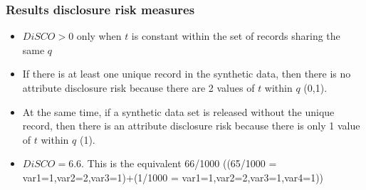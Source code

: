 \documentclass[t,8pt,utfx8]{beamer}
\begin{document}
\begin{spacing}{1.25}
\begin{frame}[t]\frametitle{Results disclosure risk measures}
\begin{minipage}[t]{0.48\textwidth}
    \begin{table}[]
        \centering
        \caption{x 1 synthetic data set (seed = 1237)}
        \resizebox{\textwidth}{!}{}
        \label{table:disclosure_risk_1}
    \end{table}

\begin{itemize}
    \small
    \item $DiSCO > 0$ only when $t$ is constant within the set of records sharing the same $q$


    \item If there is at least one unique record in the synthetic data, then there is no attribute disclosure risk because there are 2 values of $t$ within $q$ (0,1).  
    \item At the same time, if a synthetic data set is released without the unique record, then there is an attribute disclosure risk because there is only 1 value of $t$ within $q$ (1).
\end{itemize}

\end{minipage}%
\hfill%
\begin{minipage}[t]{0.48\textwidth}
    \begin{table}[]
        \centering
        \caption{x 10 synthetic data sets}
        \resizebox{\textwidth}{!}{}
        \label{table:disclosure_risk_10}
    \end{table}

    \begin{itemize}
        \small
        \item $DiSCO = 6.6$.  This is the equivalent 66/1000 ((65/1000 = var1=1,var2=2,var3=1)+(1/1000 = var1=1,var2=2,var3=1,var4=1))

    \end{itemize}
\end{minipage}
\end{frame}



\end{spacing}
\end{document}

